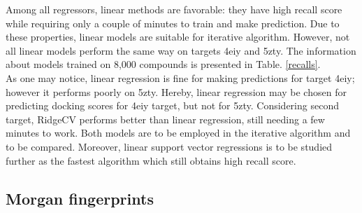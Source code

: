Among all regressors, linear methods are favorable: they have high recall score while requiring only a couple of minutes to train and make prediction.
Due to these properties, linear models are suitable for iterative algorithm. However, not all linear models perform the same way on targets 4eiy and 5zty. The information about models trained on 8,000 compounds is presented in Table. \ref{recalls}.\\

As one may notice, linear regression is fine for making predictions for target 4eiy; however it performs poorly on 5zty. 
Hereby, linear regression may be chosen for predicting docking scores for 4eiy target, but not for 5zty.
Considering second target, RidgeCV performs better than linear regression, still needing a few minutes to work.
Both models are to be employed in the iterative algorithm and to be compared.
Moreover, linear support vector regressions is to be studied further as the fastest algorithm which still obtains high recall score.\\



\subsection{Morgan fingerprints}

